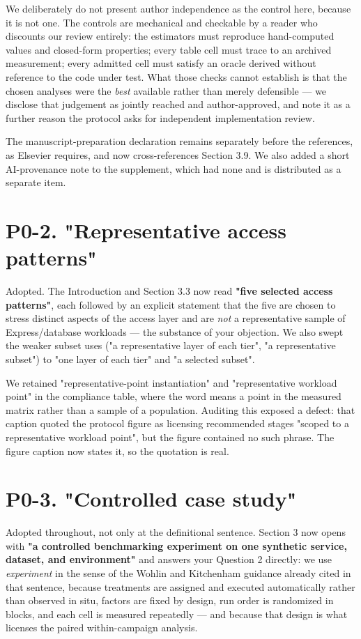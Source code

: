 \documentclass[11pt,a4paper]{article}
\begin{document}
We deliberately do not present author independence as the control here, because it is not one. The controls are mechanical and checkable by a reader who discounts our review entirely: the estimators must reproduce hand-computed values and closed-form properties; every table cell must trace to an archived measurement; every admitted cell must satisfy an oracle derived without reference to the code under test. What those checks cannot establish is that the chosen analyses were the \emph{best} available rather than merely defensible --- we disclose that judgement as jointly reached and author-approved, and note it as a further reason the protocol asks for independent implementation review.

The manuscript-preparation declaration remains separately before the references, as Elsevier requires, and now cross-references Section 3.9. We also added a short AI-provenance note to the supplement, which had none and is distributed as a separate item.

\section*{P0-2. "Representative access patterns"}

Adopted. The Introduction and Section 3.3 now read \textbf{"five selected access patterns"}, each followed by an explicit statement that the five are chosen to stress distinct aspects of the access layer and are \emph{not} a representative sample of Express/database workloads --- the substance of your objection. We also swept the weaker subset uses ("a representative layer of each tier", "a representative subset") to "one layer of each tier" and "a selected subset".

We retained "representative-point instantiation" and "representative workload point" in the compliance table, where the word means a point in the measured matrix rather than a sample of a population. Auditing this exposed a defect: that caption quoted the protocol figure as licensing recommended stages "scoped to a representative workload point", but the figure contained no such phrase. The figure caption now states it, so the quotation is real.

\section*{P0-3. "Controlled case study"}

Adopted throughout, not only at the definitional sentence. Section 3 now opens with \textbf{"a controlled benchmarking experiment on one synthetic service, dataset, and environment"} and answers your Question 2 directly: we use \emph{experiment} in the sense of the Wohlin and Kitchenham guidance already cited in that sentence, because treatments are assigned and executed automatically rather than observed in situ, factors are fixed by design, run order is randomized in blocks, and each cell is measured repeatedly --- and because that design is what licenses the paired within-campaign analysis.
\end{document}

